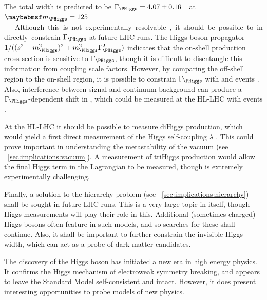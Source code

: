 The total width is predicted to be \unit{$\Gamma_{\PHiggs} = 4.07 \pm 0.16$}{\MeV} at 
\unit{$\mH = 125$}{\GeV} \cite{YR3}. Although this is not experimentally resolvable, it 
should be possible to indirectly constrain $\Gamma_{\PHiggs}$ at future LHC runs.
The Higgs boson propagator $1/((s^2 - m_{\PHiggs}^2)^2 + m_{\PHiggs}^2\Gamma_{\PHiggs}^2)$ 
indicates that the on-shell production cross section is sensitive to $\Gamma_{\PHiggs}$, 
though it is difficult to disentangle this information from coupling scale factors. 
However, by comparing the off-shell region to the on-shell region, it is possible to 
constrain $\Gamma_{\PHiggs}$ with \HepProcess{\PHiggs \HepTo \PZ\PZ} and \HWW events 
\cite{Caola:2013,Campbell:2013HZZ,Campbell:2013HWW}.
Also, interference between signal and continuum background can produce a 
$\Gamma_{\PHiggs}$-dependent shift in \mH, which could be measured at the HL-LHC with 
\HepProcess{\PHiggs \HepTo \Pphoton\Pphoton} events \cite{Dixon:2013,Martin:2013}.

At the HL-LHC it should be possible to measure diHiggs production, which would yield a 
first direct measurement of the Higgs self-coupling $\lambda$ \cite{DiHiggs}. This could 
prove important in understanding the metastability of the vacuum (see 
\Section~\ref{sec:implications:vacuum}). A measurement of triHiggs production would allow 
the final Higgs term in the Lagrangian to be measured, though is extremely experimentally 
challenging.

Finally, a solution to the hierarchy problem (see 
\Section~\ref{sec:implications:hierarchy}) shall be sought in future LHC runs. This is a 
very large topic in itself, though Higgs measurements will play their role in this. 
Additional (sometimes charged) Higgs bosons often feature in such models, and so searches 
for these shall continue. Also, it shall be important to further constrain the invisible 
Higgs width, which can act as a probe of dark matter candidates.

The discovery of the Higgs boson has initiated a new era in high energy physics. It 
confirms the Higgs mechanism of electroweak symmetry breaking, and appears to leave the 
Standard Model self-consistent and intact. However, it does present interesting 
opportunities to probe models of new physics.


